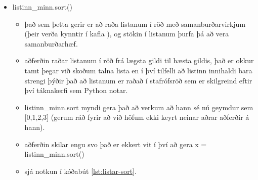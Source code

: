 \begin{itemize}
	\item listinn\_minn.sort()
	\begin{itemize}
		\item það sem þetta gerir er að raða listanum í röð með samanburðarvirkjum (þeir verða kynntir í kafla ), og stökin í listanum þurfa þá að vera samanburðarhæf.
		\item aðferðin raðar listanum í röð frá lægsta gildi til hæsta gildis, það er okkur tamt þegar við skoðum talna lista en í því tilfelli að listinn innihaldi bara strengi þýðir það að listanum er raðað í stafrófsröð sem er skilgreind eftir því táknakerfi sem Python notar.
		\item listinn\_minn.sort myndi gera það að verkum að hann sé nú geymdur sem [0,1,2,3] (gerum ráð fyrir að við höfum ekki keyrt neinar aðrar aðferðir á hann).
		\item aðferðin skilar engu svo það er ekkert vit í því að gera x = listinn\_minn.sort()
		\item sjá notkun í kóðabút \ref{lst:listar-sort}.
	\end{itemize}
	
\end{itemize}

